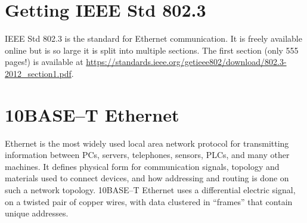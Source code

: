 \documentclass{article}
\begin{document}
\section{Getting IEEE Std 802.3}
IEEE Std 802.3 is the standard for Ethernet communication.
It is freely available online but is so large it is split
into multiple sections.
The first section (only 555 pages!) is available at
\url{https://standards.ieee.org/getieee802/download/802.3-2012\_section1.pdf}.


\section{10BASE--T Ethernet}

Ethernet is the most widely used local area network protocol for transmitting
information between PCs, servers, telephones, sensors, PLCs, and many other machines.
It defines physical form for communication signals,
topology and materials used to connect devices,
and how addressing and routing is done on such a network topology.
10BASE--T Ethernet uses a differential electric signal, on a twisted pair
of copper wires, with data clustered in ``frames'' that contain unique
addresses.
\end{document}
